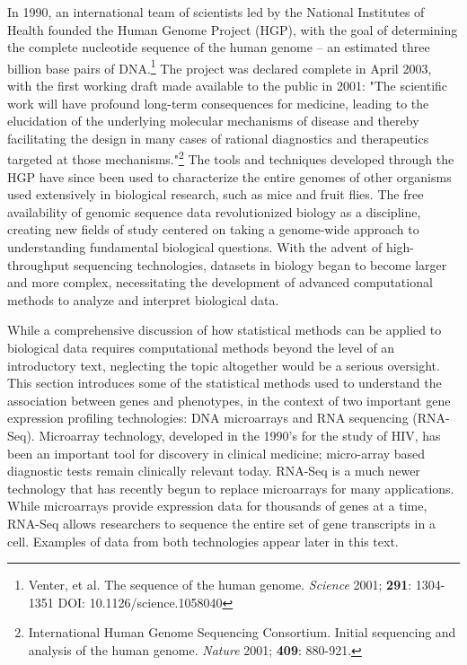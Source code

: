 In 1990, an international team of scientists led by the National Institutes of Health founded the Human Genome Project (HGP), with the goal of determining the complete nucleotide sequence of the human genome -- an estimated three billion base pairs of DNA.\footnote{Venter, et al. The sequence of the human genome. \textit{Science} 2001; \textbf{291}: 1304-1351 DOI: 10.1126/science.1058040} The project was declared complete in April 2003, with the first working draft made available to the public in 2001: "The scientific work will have profound long-term consequences for medicine, leading to the elucidation of the underlying molecular mechanisms of disease and thereby facilitating the design in many cases of rational diagnostics and therapeutics targeted at those mechanisms."\footnote{International Human Genome Sequencing Consortium. Initial sequencing and analysis of the human genome. \textit{Nature} 2001; \textbf{409}: 880-921.} The tools and techniques developed through the HGP have since been used to characterize the entire genomes of other organisms used extensively in biological research, such as mice and fruit flies. The free availability of genomic sequence data revolutionized biology as a discipline, creating new fields of study centered on taking a genome-wide approach to understanding fundamental biological questions. With the advent of high-throughput sequencing technologies, datasets in biology began to become larger and more complex, necessitating the development of advanced computational methods to analyze and interpret biological data. 

While a comprehensive discussion of how statistical methods can be applied to biological data requires computational methods beyond the level of an introductory text, neglecting the topic altogether would be a serious oversight. This section introduces some of the statistical methods used to understand the association between genes and phenotypes, in the context of two important gene expression profiling technologies: DNA microarrays and RNA sequencing (RNA-Seq). Microarray technology, developed in the 1990's for the study of HIV, has been an important tool for discovery in clinical medicine; micro-array based diagnostic tests remain clinically relevant today. RNA-Seq is a much newer technology that has recently begun to replace microarrays for many applications. While microarrays provide expression data for thousands of genes at a time, RNA-Seq allows researchers to sequence the entire set of gene transcripts in a cell. Examples of data from both technologies appear later in this text. 

